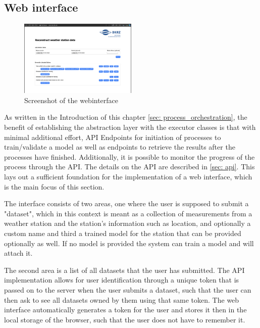 \subsection{Web interface}

\begin{figure}
\centering
\includegraphics[width=0.5\textwidth]{resources/images/webinterface_screenshot.png}
\caption{Screenshot of the webinterface}
\label{fig: webinterface_screenshot}
\end{figure}

As written in the Introduction of this chapter \ref{sec: process_orchestration}, the benefit of establishing the abstraction layer with the executor classes is that with minimal additional effort, API Endpoints for initiation of processes to train/validate a model as well as endpoints to retrieve the results after the processes have finished.
Additionally, it is possible to monitor the progress of the process through the API.
The details on the API are described in \autoref{sec: api}.
This lays out a sufficient foundation for the implementation of a web interface, which is the main focus of this section.

The interface consists of two areas, one where the user is supposed to submit a "dataset", which in this context is meant as a collection of measurements from a weather station and the station's information such as location, and optionally a custom name and third a trained model for the station that can be provided optionally as well.
If no model is provided the system can train a model and will attach it.

The second area is a list of all datasets that the user has submitted.
The API implementation allows for user identification through a unique token that is passed on to the server when the user submits a dataset, such that the user can then ask to see all datasets owned by them using that same token.
The web interface automatically generates a token for the user and stores it then in the local storage of the browser, such that the user does not have to remember it.

